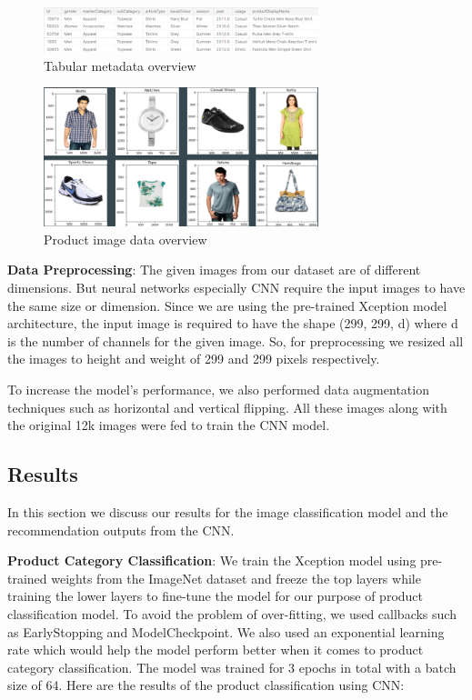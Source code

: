 \documentclass[12pt,twocolumn,letterpaper,Times New Roman]{article}
\begin{document}
\begin{figure}[!h]
    \centering
    \includegraphics[width=80mm]{fig_1.png}
    \caption{Tabular metadata overview}
    \label{fig:12}
\end{figure}

\begin{figure}[!h]
    \centering
    \includegraphics[width=80mm]{fig_2.png}
    \caption{Product image data overview}
    \label{fig:12}
\end{figure}

\textbf{Data Preprocessing}: The given images from our dataset are of different dimensions. But neural networks especially CNN require the input images to have the same size or dimension. Since we are using the pre-trained Xception model architecture, the input image is required to have the shape (299, 299, d) where d is the number of channels for the given image. So, for preprocessing we resized all the images to height and weight of 299 and 299 pixels respectively. 

To increase the model’s performance, we also performed data augmentation techniques such as horizontal and vertical flipping. All these images along with the original 12k images were fed to train the CNN model.

\subsection{Results}
In this section we discuss our results for the image classification model and the recommendation outputs from the CNN.

\textbf{Product Category Classification}: We train the Xception model using pre-trained weights from the ImageNet dataset and freeze the top layers while training the lower layers to fine-tune the model for our purpose of product classification model\cite{exception}. To avoid the problem of over-fitting, we used callbacks such as EarlyStopping and ModelCheckpoint\cite{chollet2015keras}. We also used an exponential learning rate which would help the model perform better when it comes to product category classification. The model was trained for 3 epochs in total with a batch size of 64. Here are the results of the product classification using CNN:
\end{document}
